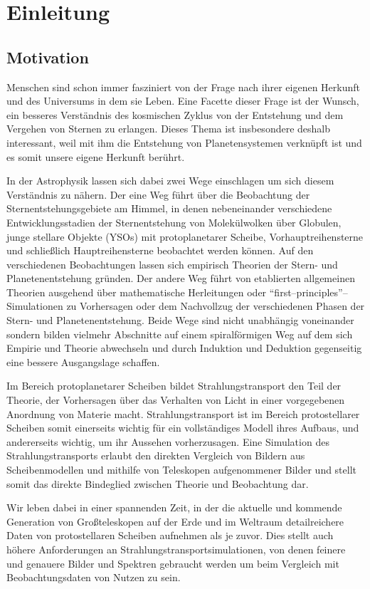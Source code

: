 	\chapter{Einleitung}
	\section{Motivation}
	Menschen sind schon immer fasziniert von der Frage nach ihrer eigenen Herkunft und des Universums in dem sie Leben. Eine Facette dieser Frage ist der Wunsch, ein besseres Verständnis des kosmischen Zyklus von der Entstehung und dem Vergehen von Sternen zu erlangen. Dieses Thema ist insbesondere deshalb interessant, weil mit ihm die Entstehung von Planetensystemen verknüpft ist und es somit unsere eigene Herkunft berührt.
	
	In der Astrophysik lassen sich dabei zwei Wege einschlagen um sich diesem Verständnis zu nähern. Der eine Weg führt über die Beobachtung der Sternentstehungsgebiete am Himmel, in denen nebeneinander verschiedene Entwicklungsstadien der Sternentstehung von Molekülwolken über Globulen, junge stellare Objekte (YSOs) mit protoplanetarer Scheibe, Vorhauptreihensterne und schließlich Hauptreihensterne beobachtet werden können. Auf den verschiedenen Beobachtungen lassen sich empirisch Theorien der Stern- und Planetenentstehung gründen. Der andere Weg führt von etablierten allgemeinen Theorien ausgehend über mathematische Herleitungen oder ``first--principles''--Simulationen zu Vorhersagen oder dem Nachvollzug der verschiedenen Phasen der Stern- und Planetenentstehung. Beide Wege sind nicht unabhängig voneinander sondern bilden vielmehr Abschnitte auf einem spiralförmigen Weg auf dem sich Empirie und Theorie abwechseln und durch Induktion und Deduktion gegenseitig eine bessere Ausgangslage schaffen.
	
	Im Bereich protoplanetarer Scheiben bildet Strahlungstransport den Teil der Theorie, der Vorhersagen über das Verhalten von Licht in einer vorgegebenen Anordnung von Materie macht. Strahlungstransport ist im Bereich protostellarer Scheiben somit einerseits wichtig für ein vollständiges Modell ihres Aufbaus, und andererseits wichtig, um ihr Aussehen vorherzusagen. Eine Simulation des Strahlungstransports erlaubt den direkten Vergleich von Bildern aus Scheibenmodellen und mithilfe von Teleskopen aufgenommener Bilder und stellt somit das direkte Bindeglied zwischen Theorie und Beobachtung dar.
	
	Wir leben dabei in einer spannenden Zeit, in der die aktuelle und kommende Generation von Großteleskopen auf der Erde und im Weltraum detailreichere Daten von protostellaren Scheiben aufnehmen als je zuvor. Dies stellt auch höhere Anforderungen an Strahlungstransportsimulationen, von denen feinere und genauere Bilder und Spektren gebraucht werden um beim Vergleich mit Beobachtungsdaten von Nutzen zu sein.
	
